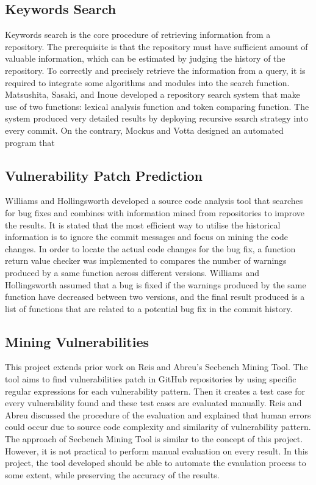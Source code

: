 \documentclass[12pt, a4paper]{report}
\begin{document}
{\subsection{Keywords Search}
Keywords search is the core procedure of retrieving information from a repository. The prerequisite
is that the repository must have sufficient amount of valuable information, which can be estimated
by judging the history of the repository. To correctly and precisely retrieve the information from a
query, it is required to integrate some algorithms and modules into the search function.
Matsushita, Sasaki, and Inoue \cite{matsushita_2005} developed a repository search system
that make use of two functions: lexical analysis function and token comparing function. The system
produced very detailed results by deploying recursive search strategy into every commit. On the
contrary, Mockus and Votta \cite{mockus_2000} designed an automated program that

\subsection{Vulnerability Patch Prediction}
Williams and Hollingsworth \cite{williams_2005} developed a source code analysis tool that searches
for bug fixes and combines with information mined from repositories to improve the results. It is
stated that the most efficient way to utilise the historical information is to ignore the commit
messages and focus on mining the code changes. In order to locate the actual code changes for the
bug fix, a function return value checker was implemented to compares the number of warnings produced
by a same function across different versions. Williams and Hollingsworth assumed that a bug is fixed
if the warnings produced by the same function have decreased between two versions, and the final
result produced is a list of functions that are related to a potential bug fix in the commit
history.

\subsection{Mining Vulnerabilities}
This project extends prior work on Reis and Abreu's \cite{secbench} Secbench Mining Tool. The tool
aims to find vulnerabilities patch in GitHub repositories by using specific regular expressions for
each vulnerability pattern. Then it creates a test case for every vulnerability found and these test
cases are evaluated manually. Reis and Abreu \cite{reis_2017} discussed the procedure of the
evaluation and explained that human errors could occur due to source code complexity and similarity
of vulnerability pattern. The approach of Secbench Mining Tool is similar to the concept of this
project. However, it is not practical to perform manual evaluation on every result. In this project,
the tool developed should be able to automate the evaulation process to some extent, while
preserving the accuracy of the results.

}
\end{document}
